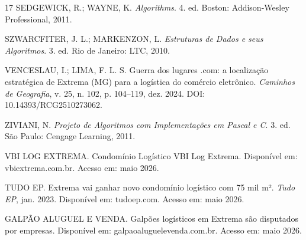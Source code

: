 \documentclass[12pt, a4paper]{article}
\begin{document}
\begin{thebibliography}{17}
SEDGEWICK, R.; WAYNE, K. \textit{Algorithms}. 4. ed. Boston: Addison-Wesley Professional, 2011.

SZWARCFITER, J. L.; MARKENZON, L. \textit{Estruturas de Dados e seus Algoritmos}. 3. ed. Rio de Janeiro: LTC, 2010.

VENCESLAU, I.; LIMA, F. L. S. Guerra dos lugares .com: a localização estratégica de Extrema (MG) para a logística do comércio eletrônico. \textit{Caminhos de Geografia}, v. 25, n. 102, p. 104--119, dez. 2024. DOI: 10.14393/RCG2510273062.

ZIVIANI, N. \textit{Projeto de Algoritmos com Implementações em Pascal e C}. 3. ed. São Paulo: Cengage Learning, 2011.

VBI LOG EXTREMA. Condomínio Logístico VBI Log Extrema. Disponível em: vbiextrema.com.br. Acesso em: maio 2026.

TUDO EP. Extrema vai ganhar novo condomínio logístico com 75 mil m². \textit{Tudo EP}, jan. 2023. Disponível em: tudoep.com. Acesso em: maio 2026.

GALPÃO ALUGUEL E VENDA. Galpões logísticos em Extrema são disputados por empresas. Disponível em: galpaoaluguelevenda.com.br. Acesso em: maio 2026.

\end{thebibliography}
\end{document}
